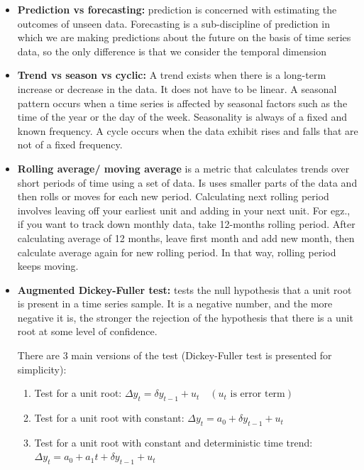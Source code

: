 \documentclass[
  letterpaper,
  DIV=11,
  numbers=noendperiod]{scrreprt}
\providecommand{\tightlist}{%
  \setlength{\itemsep}{0pt}\setlength{\parskip}{0pt}}\usepackage{longtable,booktabs,array}
\begin{document}
\begin{itemize}
\item
  \textbf{Prediction vs forecasting:} prediction is concerned with
  estimating the outcomes of unseen data. Forecasting is a
  sub-discipline of prediction in which we are making predictions about
  the future on the basis of time series data, so the only difference is
  that we consider the temporal dimension
\item
  \textbf{Trend vs season vs cyclic:} A trend exists when there is a
  long-term increase or decrease in the data. It does not have to be
  linear. A seasonal pattern occurs when a time series is affected by
  seasonal factors such as the time of the year or the day of the week.
  Seasonality is always of a fixed and known frequency. A cycle occurs
  when the data exhibit rises and falls that are not of a fixed
  frequency.
\item
  \textbf{Rolling average/ moving average} is a metric that calculates
  trends over short periods of time using a set of data. Is uses smaller
  parts of the data and then rolls or moves for each new period.
  Calculating next rolling period involves leaving off your earliest
  unit and adding in your next unit. For egz., if you want to track down
  monthly data, take 12-months rolling period. After calculating average
  of 12 months, leave first month and add new month, then calculate
  average again for new rolling period. In that way, rolling period
  keeps moving.
\item
  \textbf{Augmented Dickey-Fuller test:} tests the null hypothesis that
  a unit root is present in a time series sample. It is a negative
  number, and the more negative it is, the stronger the rejection of the
  hypothesis that there is a unit root at some level of confidence.

  There are 3 main versions of the test (Dickey-Fuller test is presented
  for simplicity):

  \begin{enumerate}
  \def\labelenumi{\arabic{enumi}.}
  \tightlist
  \item
    Test for a unit root:
    \(\Delta y_{t} = \delta y_{t-1} + u_{t} \quad(u_{t} \text{ is error term})\)
  \item
    Test for a unit root with constant:
    \(\Delta y_{t} = a_{0} + \delta y_{t-1} + u_{t}\)
  \item
    Test for a unit root with constant and deterministic time trend:
    \(\Delta y_{t} = a_{0} + a_{1}t + \delta y_{t-1} + u_{t}\)
  \end{enumerate}


\end{itemize}
\end{document}
